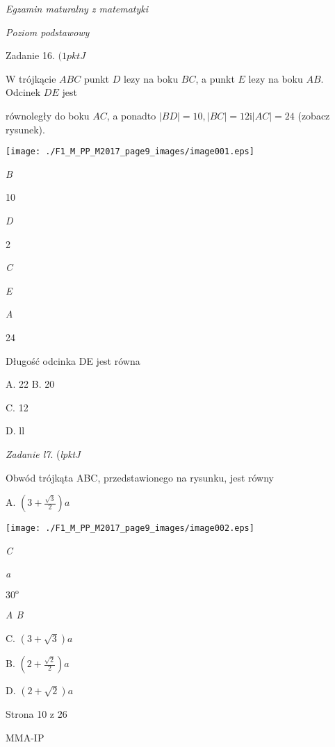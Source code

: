 \documentclass[a4paper,12pt]{article}
\begin{document}
{\it Egzamin maturalny z matematyki}

{\it Poziom podstawowy}

Zadanie 16. $(1pktJ$

$\mathrm{W}$ trójkącie $ABC$ punkt $D$ lezy na boku $BC$, a punkt $E$ lezy na boku $AB$. Odcinek $DE$ jest

równoległy do boku $AC$, a ponadto $|BD|=10, |BC|=12 \mathrm{i}|AC|=24$ (zobacz rysunek).
\begin{center}
\texttt{[image: ./F1\_M\_PP\_M2017\_page9\_images/image001.eps]}
\end{center}
{\it B}

10

{\it D}

2

{\it C}

{\it E}

{\it A}

24

Długość odcinka DE jest równa

A. 22 B. 20

C. 12

D. ll

{\it Zadanie l7}. ({\it lpktJ}

Obwód trójkąta ABC, przedstawionego na rysunku, jest równy

A. $(3+\displaystyle \frac{\sqrt{3}}{2})a$
\begin{center}
\texttt{[image: ./F1\_M\_PP\_M2017\_page9\_images/image002.eps]}
\end{center}
{\it C}

{\it a}

$30^{\mathrm{o}}$

{\it A  B}

C. $(3+\sqrt{3})a$

B. $(2+\displaystyle \frac{\sqrt{2}}{2})a$

D. $(2+\sqrt{2})a$

Strona 10 z 26

MMA-IP
\end{document}
